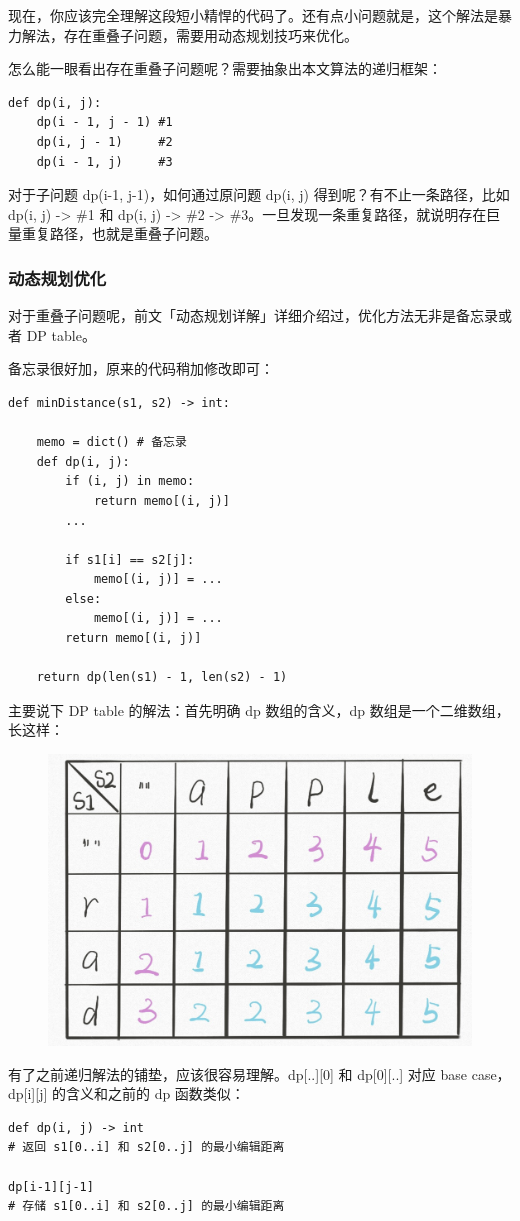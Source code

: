 \documentclass[12pt]{article}
\begin{document}
现在，你应该完全理解这段短小精悍的代码了。还有点小问题就是，这个解法是暴力解法，存在重叠子问题，需要用动态规划技巧来优化。

怎么能一眼看出存在重叠子问题呢？需要抽象出本文算法的递归框架：
\begin{lstlisting}
def dp(i, j):
    dp(i - 1, j - 1) #1
    dp(i, j - 1)     #2
    dp(i - 1, j)     #3
\end{lstlisting}

对于子问题 dp(i-1, j-1)，如何通过原问题 dp(i, j) 得到呢？有不止一条路径，比如 dp(i, j) -> \#1 和 dp(i, j) -> \#2 -> \#3。一旦发现一条重复路径，就说明存在巨量重复路径，也就是重叠子问题。

\subsubsection{动态规划优化}
对于重叠子问题呢，前文「动态规划详解」详细介绍过，优化方法无非是备忘录或者 DP table。

备忘录很好加，原来的代码稍加修改即可：
\begin{lstlisting}
def minDistance(s1, s2) -> int:

    memo = dict() # 备忘录
    def dp(i, j):
        if (i, j) in memo: 
            return memo[(i, j)]
        ...
        
        if s1[i] == s2[j]:
            memo[(i, j)] = ...  
        else:
            memo[(i, j)] = ...
        return memo[(i, j)]
    
    return dp(len(s1) - 1, len(s2) - 1)
\end{lstlisting}

主要说下 DP table 的解法：首先明确 dp 数组的含义，dp 数组是一个二维数组，长这样：
\begin{figure}[H]
    \centering
    \includegraphics[width=.6\textwidth]{fig/Dynamic_Programming_Edit_Distance_2.png}
\end{figure}

有了之前递归解法的铺垫，应该很容易理解。dp[..][0] 和 dp[0][..] 对应 base case，dp[i][j] 的含义和之前的 dp 函数类似：
\begin{lstlisting}
def dp(i, j) -> int
# 返回 s1[0..i] 和 s2[0..j] 的最小编辑距离

dp[i-1][j-1]
# 存储 s1[0..i] 和 s2[0..j] 的最小编辑距离
\end{lstlisting}
\end{document}
